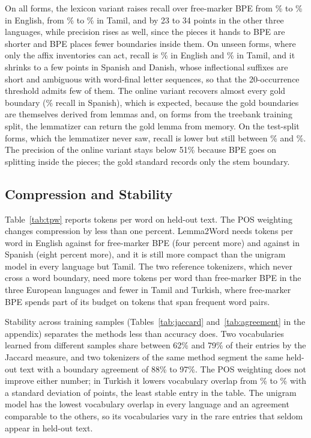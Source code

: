 

On all forms, the lexicon variant raises recall over free-marker BPE from \nRBpeEnglish\% to \nLtwLexiconAllREnglish\% in English, from \nRBpeTamil\% to \nLtwLexiconAllRTamil\% in Tamil, and by 23 to 34 points in the other three languages, while precision rises as well, since the pieces it hands to BPE are shorter and BPE places fewer boundaries inside them.
On unseen forms, where only the affix inventories can act, recall is \nLtwLexiconUnseenREnglish\% in English and \nLtwLexiconUnseenRTamil\% in Tamil, and it shrinks to a few points in Spanish and Danish, whose inflectional suffixes are short and ambiguous with word-final letter sequences, so that the 20-occurrence threshold admits few of them.
The online variant recovers almost every gold boundary (\nLtwOnlineAllRSpanish\% recall in Spanish), which is expected, because the gold boundaries are themselves derived from lemmas and, on forms from the treebank training split, the lemmatizer can return the gold lemma from memory.
On the test-split forms, which the lemmatizer never saw, recall is lower but still between \nLtwOnlineTestRDanish\% and \nLtwOnlineTestRSpanish\%.
The precision of the online variant stays below 51\% because BPE goes on splitting inside the pieces; the gold standard records only the stem boundary.

\subsection{Compression and Stability}\label{sec:res-compression}
Table~\ref{tab:tpw} reports tokens per word on held-out text.
The POS weighting changes compression by less than one percent.
Lemma2Word needs \nTpwLtwEnglish{} tokens per word in English against \nTpwBpeEnglish{} for free-marker BPE (four percent more) and \nTpwLtwSpanish{} against \nTpwBpeSpanish{} in Spanish (eight percent more), and it is still more compact than the unigram model in every language but Tamil.
The two reference tokenizers, which never cross a word boundary, need more tokens per word than free-marker BPE in the three European languages and fewer in Tamil and Turkish, where free-marker BPE spends part of its budget on tokens that span frequent word pairs.



Stability across training samples (Tables~\ref{tab:jaccard} and~\ref{tab:agreement} in the appendix) separates the methods less than accuracy does.
Two vocabularies learned from different samples share between 62\% and 79\% of their entries by the Jaccard measure, and two tokenizers of the same method segment the same held-out text with a boundary agreement of 88\% to 97\%.
The POS weighting does not improve either number; in Turkish it lowers vocabulary overlap from \nJacBpeTurkish\% to \nJacPosTurkish\% with a standard deviation of \nJacPosTurkishSd{} points, the least stable entry in the table.
The unigram model has the lowest vocabulary overlap in every language and an agreement comparable to the others, so its vocabularies vary in the rare entries that seldom appear in held-out text.

